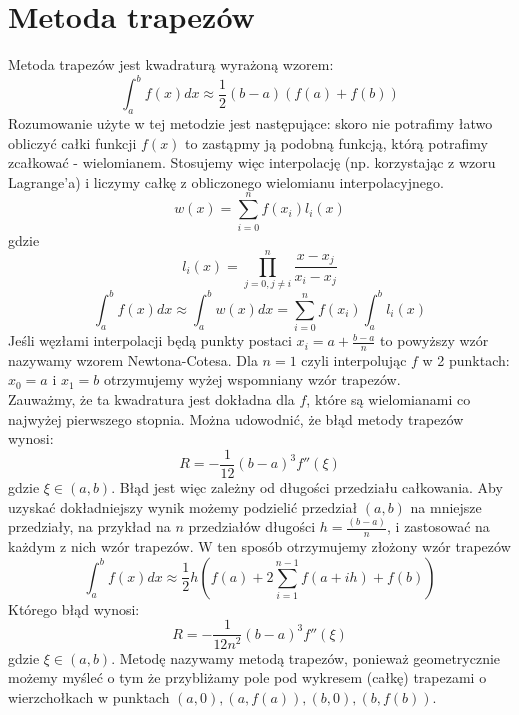 \documentclass{article}
\begin{document}
\section*{Metoda trapezów}
Metoda trapezów jest kwadraturą wyrażoną wzorem: 
\begin{equation}
\int_a^b f(x) dx \approx \frac{1}{2}(b-a) (f(a)+f(b))
\end{equation}
Rozumowanie użyte w tej metodzie jest następujące: skoro nie potrafimy łatwo obliczyć całki funkcji $f(x)$ to zastąpmy ją podobną funkcją, którą potrafimy zcałkować - wielomianem. Stosujemy więc interpolację (np. korzystając z wzoru Lagrange'a) i liczymy całkę z obliczonego wielomianu interpolacyjnego. 
\begin{equation}
w(x) = \sum_{i=0}^n f(x_i)l_i(x)
\end{equation}
gdzie 
\begin{equation}
 l_i(x) = \prod ^n_{j=0, j\neq i} \frac{x-x_j}{x_i-x_j} 
\end{equation}
\begin{equation}
\int_a^b f(x) dx \approx \int_a^b w(x) dx =  \sum_{i=0}^n f(x_i)\int_a^bl_i(x)
\end{equation}
Jeśli węzłami interpolacji będą punkty postaci $x_i = a+ \frac{b-a}{n} $ to powyższy wzór nazywamy wzorem Newtona-Cotesa. Dla $n=1$ czyli interpolując $f$ w 2 punktach: $x_0=a$ i $x_1=b$ otrzymujemy wyżej wspomniany wzór trapezów.\\
Zauważmy, że ta kwadratura jest dokładna dla $f$, które są wielomianami co najwyżej pierwszego stopnia. Można udowodnić, że błąd metody trapezów wynosi:
\begin{equation}
R = -\frac{1}{12}(b-a)^3f''(\xi)
\end{equation}
gdzie $\xi \in (a, b)$.
Błąd jest więc zależny od długości przedziału całkowania. Aby uzyskać dokładniejszy wynik możemy podzielić przedział $(a, b)$ na mniejsze przedziały, na przykład na $n$ przedziałów długości $h=\frac{(b-a)}{n}$, i zastosować na każdym z nich wzór trapezów. W ten sposób otrzymujemy złożony wzór trapezów
\begin{equation}
\int_a^b f(x) dx \approx \frac{1}{2} h (f(a) + 2\sum_{i=1} ^{n-1} f(a+ih) +f(b))
\end{equation}
Którego błąd wynosi:
\begin{equation}
R = -\frac{1}{12n^2}(b-a)^3f''(\xi)
\end{equation}
gdzie $\xi \in (a, b)$.
Metodę nazywamy metodą trapezów, ponieważ geometrycznie możemy myśleć o tym że przybliżamy pole pod wykresem (całkę) trapezami o wierzchołkach w punktach $ (a, 0), (a, f(a)), (b, 0), (b, f(b)) $.
\end{document}
